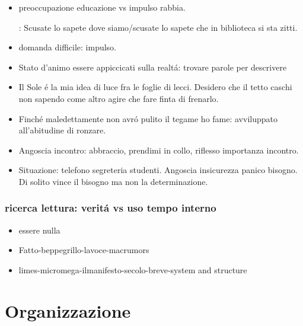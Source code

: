 \begin{itemize}

\item preoccupazione educazione vs impulso rabbia.

: Scusate lo sapete dove siamo/scusate lo sapete che in biblioteca si sta zitti.

\item domanda difficile: impulso.

\item Stato d'animo essere appiccicati sulla realt\'a: trovare parole per descrivere

\item Il Sole \'e la mia idea di luce fra le foglie di lecci. Desidero che il tetto caschi non sapendo come altro agire che fare finta di frenarlo.

\item Finch\'e maledettamente non avr\'o pulito il tegame ho fame: avviluppato all'abitudine di ronzare.

\item Angoscia incontro: abbraccio, prendimi in collo, riflesso importanza incontro.

\item Situazione: telefono segreteria studenti. Angoscia insicurezza panico bisogno. Di solito vince il bisogno ma non la determinazione.

\end{itemize}


\subsection{ricerca lettura: verit\'a vs uso tempo interno}

\begin{itemize}

\item essere nulla

\item Fatto-beppegrillo-lavoce-macrumors

\item limes-micromega-ilmanifesto-secolo-breve-system and structure

\end{itemize}


{\let\clearpage\relax
\chapter{Organizzazione}
}

